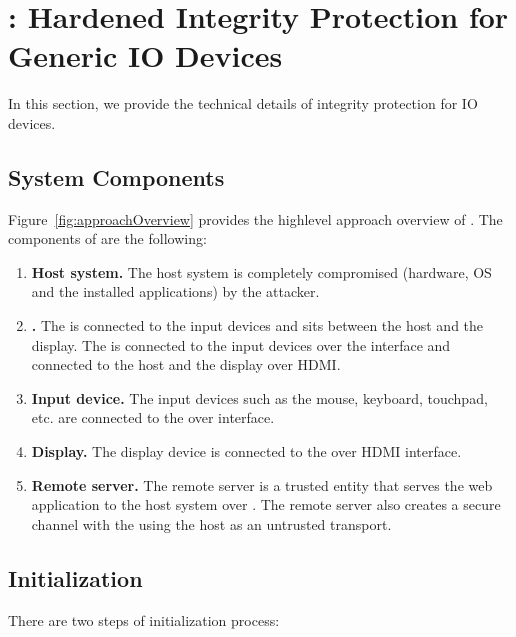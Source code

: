 \section{\name: Hardened Integrity Protection for Generic IO Devices}
\label{sec:systemDesign}


In this section, we provide the technical details of \name integrity protection for IO devices.  

\subsection{System Components}
\label{sec:systemDesign:components}

Figure~\ref{fig:approachOverview} provides the highlevel approach overview of \name. The components of \name are the following:

\begin{enumerate}
  \item \textbf{Host system.} The host system is completely compromised (hardware, OS and the installed applications) by the attacker.
  \item \textbf{\device.} The \device is connected to the input devices and sits between the host and the display. The \device is connected to the input devices over the \usb interface and connected to the host and the display over HDMI.
  \item \textbf{Input device.} The input devices such as the mouse, keyboard, touchpad, etc. are connected to the \device over \usb interface.
  \item \textbf{Display.} The display device is connected to the \device over HDMI interface.
  \item \textbf{Remote server.} The remote server is a trusted entity that serves the web application to the host system over \http. The remote server also creates a secure channel with the \device using the host as an untrusted transport. 
  
\end{enumerate}

\subsection{Initialization} 
\label{sec:systemDesign:init}

There are two steps of initialization process: 

